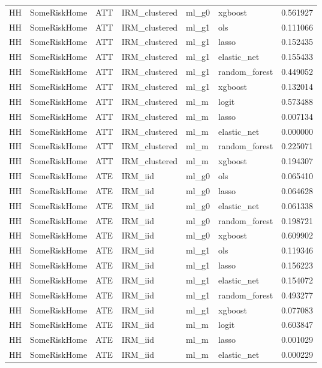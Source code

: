 \begin{longtable}{llllllr}
HH & SomeRiskHome & ATT & IRM\_clustered & ml\_g0 & xgboost & 0.561927 \\
HH & SomeRiskHome & ATT & IRM\_clustered & ml\_g1 & ols & 0.111066 \\
HH & SomeRiskHome & ATT & IRM\_clustered & ml\_g1 & lasso & 0.152435 \\
HH & SomeRiskHome & ATT & IRM\_clustered & ml\_g1 & elastic\_net & 0.155433 \\
HH & SomeRiskHome & ATT & IRM\_clustered & ml\_g1 & random\_forest & 0.449052 \\
HH & SomeRiskHome & ATT & IRM\_clustered & ml\_g1 & xgboost & 0.132014 \\
HH & SomeRiskHome & ATT & IRM\_clustered & ml\_m & logit & 0.573488 \\
HH & SomeRiskHome & ATT & IRM\_clustered & ml\_m & lasso & 0.007134 \\
HH & SomeRiskHome & ATT & IRM\_clustered & ml\_m & elastic\_net & 0.000000 \\
HH & SomeRiskHome & ATT & IRM\_clustered & ml\_m & random\_forest & 0.225071 \\
HH & SomeRiskHome & ATT & IRM\_clustered & ml\_m & xgboost & 0.194307 \\
HH & SomeRiskHome & ATE & IRM\_iid & ml\_g0 & ols & 0.065410 \\
HH & SomeRiskHome & ATE & IRM\_iid & ml\_g0 & lasso & 0.064628 \\
HH & SomeRiskHome & ATE & IRM\_iid & ml\_g0 & elastic\_net & 0.061338 \\
HH & SomeRiskHome & ATE & IRM\_iid & ml\_g0 & random\_forest & 0.198721 \\
HH & SomeRiskHome & ATE & IRM\_iid & ml\_g0 & xgboost & 0.609902 \\
HH & SomeRiskHome & ATE & IRM\_iid & ml\_g1 & ols & 0.119346 \\
HH & SomeRiskHome & ATE & IRM\_iid & ml\_g1 & lasso & 0.156223 \\
HH & SomeRiskHome & ATE & IRM\_iid & ml\_g1 & elastic\_net & 0.154072 \\
HH & SomeRiskHome & ATE & IRM\_iid & ml\_g1 & random\_forest & 0.493277 \\
HH & SomeRiskHome & ATE & IRM\_iid & ml\_g1 & xgboost & 0.077083 \\
HH & SomeRiskHome & ATE & IRM\_iid & ml\_m & logit & 0.603847 \\
HH & SomeRiskHome & ATE & IRM\_iid & ml\_m & lasso & 0.001029 \\
HH & SomeRiskHome & ATE & IRM\_iid & ml\_m & elastic\_net & 0.000229 \\

\end{longtable}
